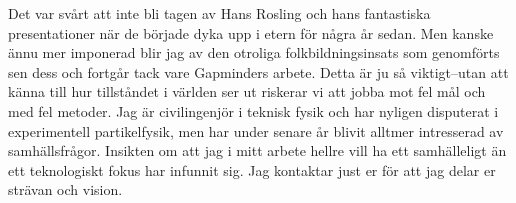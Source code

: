 \documentclass[11pt, a4paper]{../awesome-cv} %
\begin{document}
\makecvheader %

\makelettertitle %


\begin{cvletter}
\vspace{0.5cm}



Det var svårt att inte bli tagen av Hans Rosling och hans fantastiska presentationer när de började dyka upp i etern för några år sedan.  
Men kanske ännu mer imponerad blir jag av den otroliga folkbildningsinsats som genomförts sen dess och fortgår tack vare Gapminders arbete. %
Detta är ju så viktigt–utan att känna till hur tillståndet i världen ser ut riskerar vi att jobba mot fel mål och med fel metoder. %
Jag är civilingenjör i teknisk fysik och har nyligen disputerat i experimentell partikelfysik, men har under senare år blivit alltmer intresserad av samhällsfrågor.
Insikten om att jag i mitt arbete hellre vill ha ett samhälleligt än ett teknologiskt fokus har infunnit sig.
Jag kontaktar just er för att jag delar er strävan och vision.


\end{cvletter}
\end{document}
